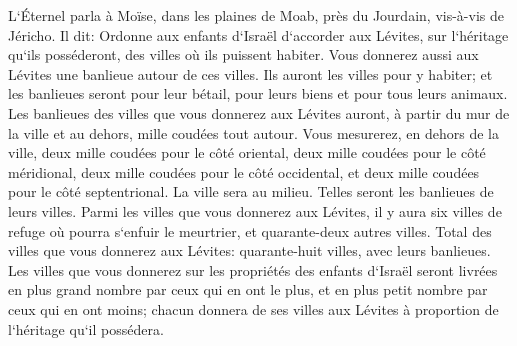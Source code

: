 \verse L`Éternel parla à Moïse, dans les plaines de Moab, près du Jourdain, vis-à-vis de Jéricho. Il dit: 
\verse Ordonne aux enfants d`Israël d`accorder aux Lévites, sur l`héritage qu`ils posséderont, des villes où ils puissent habiter. Vous donnerez aussi aux Lévites une banlieue autour de ces villes. 
\verse Ils auront les villes pour y habiter; et les banlieues seront pour leur bétail, pour leurs biens et pour tous leurs animaux. 
\verse Les banlieues des villes que vous donnerez aux Lévites auront, à partir du mur de la ville et au dehors, mille coudées tout autour. 
\verse Vous mesurerez, en dehors de la ville, deux mille coudées pour le côté oriental, deux mille coudées pour le côté méridional, deux mille coudées pour le côté occidental, et deux mille coudées pour le côté septentrional. La ville sera au milieu. Telles seront les banlieues de leurs villes. 
\verse Parmi les villes que vous donnerez aux Lévites, il y aura six villes de refuge où pourra s`enfuir le meurtrier, et quarante-deux autres villes. 
\verse Total des villes que vous donnerez aux Lévites: quarante-huit villes, avec leurs banlieues. 
\verse Les villes que vous donnerez sur les propriétés des enfants d`Israël seront livrées en plus grand nombre par ceux qui en ont le plus, et en plus petit nombre par ceux qui en ont moins; chacun donnera de ses villes aux Lévites à proportion de l`héritage qu`il possédera. 
